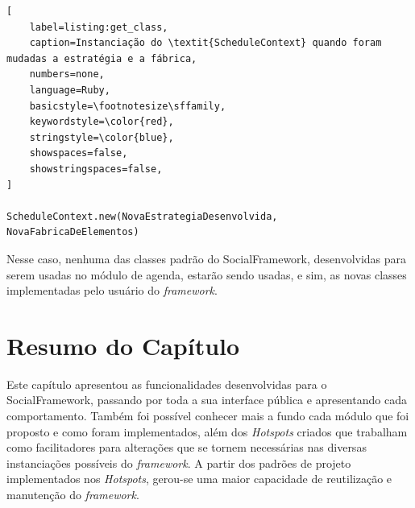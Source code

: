 \begin{lstlisting}[
    label=listing:get_class,
    caption=Instanciação do \textit{ScheduleContext} quando foram mudadas a estratégia e a fábrica,
    numbers=none,
    language=Ruby,
    basicstyle=\footnotesize\sffamily,
    keywordstyle=\color{red},
    stringstyle=\color{blue},
    showspaces=false,
    showstringspaces=false,
]

ScheduleContext.new(NovaEstrategiaDesenvolvida, NovaFabricaDeElementos)
\end{lstlisting}

Nesse caso, nenhuma das classes padrão do SocialFramework, desenvolvidas para serem usadas no módulo de agenda, estarão sendo usadas, e sim, as novas classes implementadas pelo usuário do \textit{framework}.

\section{Resumo do Capítulo}

Este capítulo apresentou as funcionalidades desenvolvidas para o SocialFramework, passando por toda a sua interface pública e apresentando cada comportamento. Também foi possível conhecer mais a fundo cada módulo que foi proposto e como foram implementados, além dos \textit{Hotspots} criados que trabalham como facilitadores para alterações que se tornem necessárias nas diversas instanciações possíveis do \textit{framework}. A partir dos padrões de projeto implementados nos \textit{Hotspots}, gerou-se uma maior capacidade de reutilização e manutenção do \textit{framework}.
